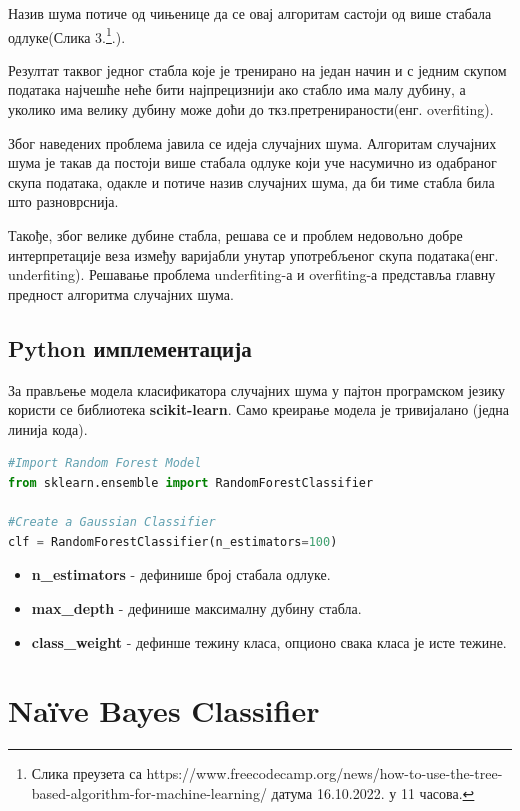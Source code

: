 \documentclass[11pt]{article} %
\begin{document}
Назив шума потиче од чињенице да се овај алгоритам састоји од више стабала
одлуке(Слика 3.\footnote{Слика преузета са https://www.freecodecamp.org/news/how-to-use-the-tree-based-algorithm-for-machine-learning/ датума 16.10.2022. у 11 часова.}.).

Резултат таквог једног стабла које је тренирано на један начин и с једним
скупом података најчешће неће бити најпрецизнији ако стабло има малу дубину, а
уколико има велику дубину може доћи до ткз.претренираности(енг. overfiting).

Због наведених проблема јавила се идеја случајних шума. Алгоритам случајних
шума је такав да постоји више стабала одлуке који уче насумично из одабраног скупа
података, одакле и потиче назив случајних шума, да би тиме стабла била што
разноврснија. 

Такође, због велике дубине стабла, решава се и проблем недовољно добре
интерпретације веза између варијабли унутар употребљеног скупа података(енг.
underfiting). Решавање проблема underfiting-а и overfiting-а представља главну предност
алгоритма случајних шума.

\subsection{Python имплементација}

За прављење модела класификатора случајних шума у пајтон програмском језику користи се библиотека \textbf{scikit-learn}. Само креирање модела је тривијалано (једна линија кода).

\begin{lstlisting}[language=Python,title=Пример 3. Класификатор случајних шума]
#Import Random Forest Model
from sklearn.ensemble import RandomForestClassifier

#Create a Gaussian Classifier
clf = RandomForestClassifier(n_estimators=100)
\end{lstlisting}
\begin{itemize}
	\item \textbf{n\_estimators} - дефинише број стабала одлуке.
	\item \textbf{max\_depth} - дефинише максималну дубину стабла.
	\item \textbf{class\_weight} - дефинше тежину класа, опционо свака класа је исте тежине.
\end{itemize}

\section{Naïve Bayes Classifier}
\end{document}
